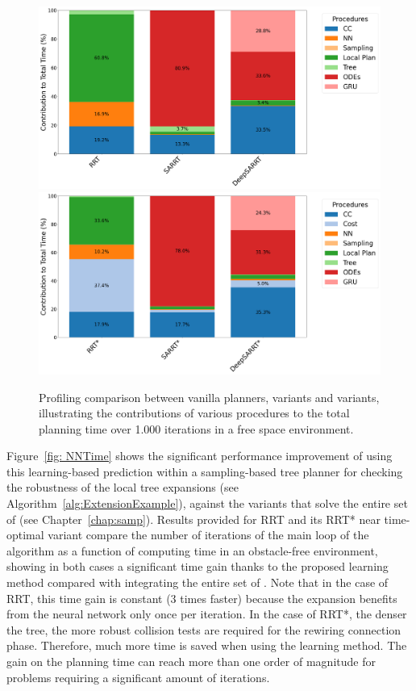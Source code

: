 \begin{figure} [h!]
    \centering
    \includegraphics[width=0.9\linewidth]{figures/robust_accurate/profiling_rrt.png}%
    \\
    \includegraphics[width=0.9\linewidth]{figures/robust_accurate/profiling_rrtstar.png}%
    \caption{Profiling comparison between vanilla planners,  variants and  variants, illustrating the contributions of various procedures to the total planning time over 1.000 iterations in a free space environment.}%
    \label{fig:NNProfiling}%
\end{figure}

Figure~\ref{fig: NNTime} shows the significant performance improvement of using this learning-based prediction within a sampling-based tree planner for checking the robustness of the local tree expansions (see Algorithm~\ref{alg:ExtensionExample}), against the  variants that solve the entire set of  (see Chapter~\ref{chap:samp}).  
Results provided for RRT and its RRT* near time-optimal variant compare the number of iterations of the main loop of the algorithm as a function of computing time in an obstacle-free environment, showing in both cases a significant time gain thanks to the proposed learning method compared with integrating the entire set of .
Note that in the case of RRT, this time gain is constant ($3$ times faster) because the expansion benefits from the neural network only once per iteration.
In the case of RRT*, the denser the tree, the more robust collision tests are required for the rewiring connection phase. 
Therefore, much more time is saved when using the learning method. 
The gain on the planning time can reach more than one order of magnitude for problems requiring a significant amount of iterations.

